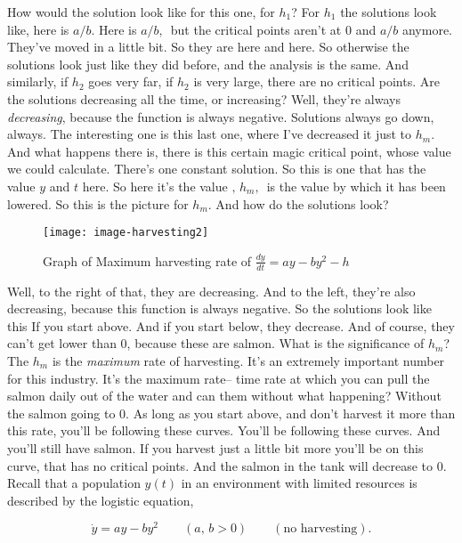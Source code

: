 How would the solution look like for this one, for $h_1$?
For $h_1$ the solutions look like, here is $a/b$.
Here is $a / b,\,$ but the critical points aren't at $0$ and $a/b$ anymore.
They've moved in a little bit. So they are here and here.
So otherwise the solutions look just like they did before,
and the analysis is the same.
And similarly, if $h_2$ goes very far, if $h_2$ is very large,
there are no critical points.
Are the solutions decreasing all the time, or increasing?
Well, they're always \emph{decreasing}, because the function is always negative.
Solutions always go down, always.
The interesting one is this last one, where I've decreased it just to $h_m$.
And what happens there is, there is this certain magic critical point,
whose value we could calculate.
There's one constant solution.
So this is one that has the value $y$ and $t$ here.
So here it's the value $,\, h_m,\,$ is the value by which it has been lowered.
So this is the picture for $h_m$.
And how do the solutions look?

\begin{wrapfigure}{r}{5.5cm}
  \texttt{[image: image-harvesting2]}
  \caption{Graph of Maximum harvesting rate of $\frac{dy}{dt} = ay - by^2 - h$}
\end{wrapfigure}

Well, to the right of that, they are decreasing.
And to the left, they're also decreasing,
because this function is always negative.
So the solutions look like this If you start above.
And if you start below, they decrease.
And of course, they can't get lower than $0$,
because these are salmon.
What is the significance of $h_m$?
The $h_m$ is the \emph{maximum} rate of harvesting.
It's an extremely important number for this industry.
It's the maximum rate-- time rate
at which you can pull the salmon daily out of the water
and can them without what happening?
Without the salmon going to $0$.
As long as you start above, and don't harvest it more
than this rate, you'll be following these curves.
You'll be following these curves.
And you'll still have salmon.
If you harvest just a little bit more
you'll be on this curve, that has no critical points.
And the salmon in the tank will decrease to 0. \\

Recall that a population $y(t)$ in an environment
with limited resources is described by the logistic equation,

\begin{equation*}
  \dot y = ay - by^2 \qquad (a,\, b > 0) \qquad (\text{no harvesting}). 
\end{equation*}

